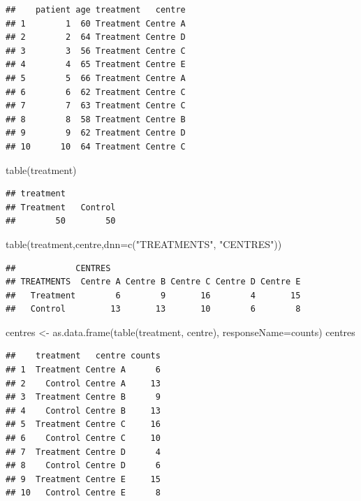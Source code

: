 \documentclass[]{article}
\newenvironment{Shaded}{\begin{snugshade}}{\end{snugshade}}
\newcommand{\AttributeTok}[1]{\textcolor[rgb]{0.77,0.63,0.00}{#1}}
\newcommand{\FunctionTok}[1]{\textcolor[rgb]{0.00,0.00,0.00}{#1}}
\newcommand{\NormalTok}[1]{#1}
\newcommand{\OtherTok}[1]{\textcolor[rgb]{0.56,0.35,0.01}{#1}}
\newcommand{\StringTok}[1]{\textcolor[rgb]{0.31,0.60,0.02}{#1}}
\begin{document}
\begin{verbatim}
##    patient age treatment   centre
## 1        1  60 Treatment Centre A
## 2        2  64 Treatment Centre D
## 3        3  56 Treatment Centre C
## 4        4  65 Treatment Centre E
## 5        5  66 Treatment Centre A
## 6        6  62 Treatment Centre C
## 7        7  63 Treatment Centre C
## 8        8  58 Treatment Centre B
## 9        9  62 Treatment Centre D
## 10      10  64 Treatment Centre C
\end{verbatim}

\begin{Shaded}
\begin{Highlighting}[]
\FunctionTok{table}\NormalTok{(treatment)}
\end{Highlighting}
\end{Shaded}

\begin{verbatim}
## treatment
## Treatment   Control 
##        50        50
\end{verbatim}

\begin{Shaded}
\begin{Highlighting}[]
\FunctionTok{table}\NormalTok{(treatment,centre,}\AttributeTok{dnn=}\FunctionTok{c}\NormalTok{(}\StringTok{"TREATMENTS"}\NormalTok{, }\StringTok{"CENTRES"}\NormalTok{))}
\end{Highlighting}
\end{Shaded}

\begin{verbatim}
##            CENTRES
## TREATMENTS  Centre A Centre B Centre C Centre D Centre E
##   Treatment        6        9       16        4       15
##   Control         13       13       10        6        8
\end{verbatim}

\begin{Shaded}
\begin{Highlighting}[]
\NormalTok{centres }\OtherTok{\textless{}{-}} \FunctionTok{as.data.frame}\NormalTok{(}\FunctionTok{table}\NormalTok{(treatment, centre), }\AttributeTok{responseName=}\StringTok{\textquotesingle{}counts\textquotesingle{}}\NormalTok{)}
\NormalTok{centres}
\end{Highlighting}
\end{Shaded}

\begin{verbatim}
##    treatment   centre counts
## 1  Treatment Centre A      6
## 2    Control Centre A     13
## 3  Treatment Centre B      9
## 4    Control Centre B     13
## 5  Treatment Centre C     16
## 6    Control Centre C     10
## 7  Treatment Centre D      4
## 8    Control Centre D      6
## 9  Treatment Centre E     15
## 10   Control Centre E      8
\end{verbatim}
\end{document}
